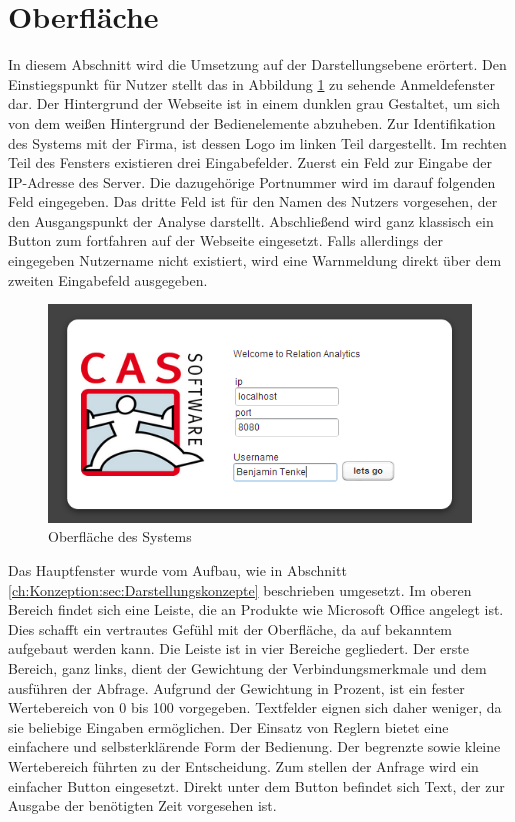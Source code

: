 \section{Oberfläche}

In diesem Abschnitt wird die Umsetzung auf der Darstellungsebene erörtert. Den Einstiegspunkt für Nutzer stellt das in Abbildung \ref{ergebniss_oberflaeche_anmeld} zu sehende Anmeldefenster dar. Der Hintergrund der Webseite ist in einem dunklen grau Gestaltet, um sich von dem weißen Hintergrund der Bedienelemente abzuheben. Zur Identifikation des Systems mit der Firma, ist dessen Logo im linken Teil dargestellt. Im rechten Teil des Fensters existieren drei Eingabefelder. Zuerst ein Feld zur Eingabe der IP-Adresse des Server. Die dazugehörige Portnummer wird im darauf folgenden Feld eingegeben. Das dritte Feld ist für den Namen des Nutzers vorgesehen, der den Ausgangspunkt der Analyse darstellt. Abschließend wird ganz klassisch ein Button zum fortfahren auf der Webseite eingesetzt. Falls allerdings der eingegeben Nutzername nicht existiert, wird eine Warnmeldung direkt über dem zweiten Eingabefeld ausgegeben. 

\begin{figure}[htbp]
\centering
\includegraphics[scale=2.0]{pics/login.png}
\caption{Oberfläche des Systems}
\label{ergebniss_oberflaeche_anmeld}
\end{figure}

Das Hauptfenster wurde vom Aufbau, wie in Abschnitt \ref{ch:Konzeption:sec:Darstellungskonzepte} beschrieben umgesetzt. Im oberen Bereich findet sich eine Leiste, die an Produkte wie Microsoft Office angelegt ist. Dies schafft ein vertrautes Gefühl mit der Oberfläche, da auf bekanntem aufgebaut werden kann. Die Leiste ist in vier Bereiche gegliedert. Der erste Bereich, ganz links, dient der Gewichtung der Verbindungsmerkmale und dem ausführen der Abfrage. Aufgrund der Gewichtung in Prozent, ist ein fester Wertebereich von 0 bis 100 vorgegeben. Textfelder eignen sich daher weniger, da sie beliebige Eingaben ermöglichen. Der Einsatz von Reglern bietet eine einfachere und selbsterklärende Form der Bedienung. Der begrenzte sowie kleine Wertebereich führten zu der Entscheidung. Zum stellen der Anfrage wird ein einfacher Button eingesetzt. Direkt unter dem Button befindet sich Text, der zur Ausgabe der benötigten Zeit vorgesehen ist. 

